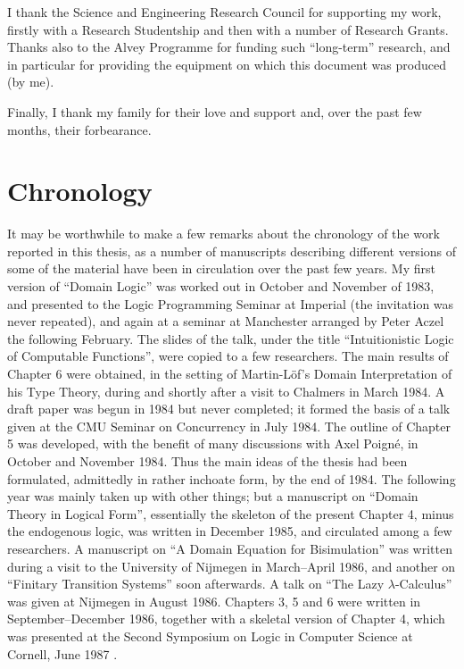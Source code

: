 I thank the Science and Engineering Research Council for supporting
my work, firstly with a Research Studentship and then with a number
of Research Grants.
Thanks also to the Alvey Programme for funding such ``long-term''
research, and in particular for providing the equipment on which
this document was produced (by me).

Finally, I thank my family for their love and support and, over the
past few months, their forbearance.
\section*{Chronology}
It may be worthwhile to make a few remarks about the chronology of the
work reported in this thesis, as a number of manuscripts describing
different versions of some of the material have been in circulation
over the past few years.
My first version of ``Domain Logic'' was worked out in October and
November of 1983, and presented to the Logic Programming Seminar
at Imperial (the invitation was never repeated), and again
at a seminar at Manchester arranged by Peter Aczel the following
February.
The slides of the talk, under the title ``Intuitionistic Logic of
Computable Functions'', were copied to a few researchers.
The main results of Chapter 6 were obtained, in the setting of
Martin-L\"{o}f's Domain Interpretation of his Type Theory,
during and shortly after a visit to Chalmers in March 1984.
A draft paper was begun in 1984 but never completed;
it formed the basis of a talk given at the CMU Seminar on Concurrency
in July 1984.
The outline of Chapter 5 was developed, with the benefit of
many discussions with Axel Poign\'{e}, in October and November 1984.
Thus the main ideas of the thesis had been formulated, admittedly in
rather inchoate form, by the end of 1984.
The following year was mainly taken up with other things;
but a manuscript on ``Domain Theory in Logical Form'',
essentially the skeleton of the present Chapter 4, minus the endogenous
logic, was written in December 1985, and circulated among a few researchers.
A manuscript on ``A Domain Equation for Bisimulation'' was written
during a visit to the University of Nijmegen in March--April 1986,
and another on ``Finitary Transition Systems'' soon afterwards.
A talk on ``The Lazy $\lambda$-Calculus'' was given at Nijmegen in
August 1986.
Chapters 3, 5 and 6 were written in September--December 1986, together
with a skeletal version of Chapter 4, which was presented at the
Second Symposium on Logic in Computer Science at Cornell, June 1987
\cite{Abr87a}.
